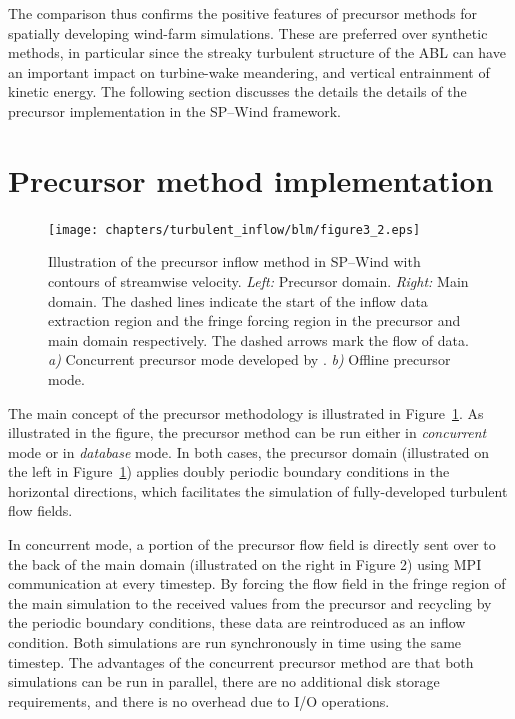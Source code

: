 	The comparison thus confirms the positive features of precursor methods for spatially developing wind-farm simulations. These are preferred over synthetic methods, in particular since the streaky turbulent structure of the ABL can have an important impact on turbine-wake meandering, and vertical entrainment of kinetic energy. The following section discusses the details 	the details of the precursor implementation in the SP--Wind framework.
	
\section{Precursor method implementation}\label{sec:inflow_CP}	
\begin{figure}
	\centering
	\texttt{[image: chapters/turbulent\_inflow/blm/figure3\_2.eps]}
	\caption{Illustration of the precursor inflow method in SP--Wind with contours of streamwise velocity. \textit{Left:} Precursor domain. \textit{Right: } Main domain. The dashed lines indicate the start of the inflow data extraction region and the fringe forcing region in the precursor and main domain respectively. The dashed arrows mark the flow of data. \emph{a)} Concurrent precursor mode developed by \cite{stevens2014concurrent}. \emph{b)} Offline precursor mode. \label{fig:CP0}}	
\end{figure}

The main concept of the precursor methodology is illustrated in Figure~\ref{fig:CP0}. As illustrated in the figure, the precursor method can be run either in \emph{concurrent} mode \citep{stevens2014concurrent} or in \emph{database} mode. In both cases, the precursor domain (illustrated on the left in Figure~\ref{fig:CP0}) applies doubly periodic boundary conditions in the horizontal directions, which facilitates the simulation of fully-developed turbulent flow fields. 

In concurrent mode, a portion of the precursor flow field is directly sent over to the back of the main domain (illustrated on the right in Figure 2) using MPI communication at every timestep. By forcing the flow field in the fringe region of the main simulation to the received values from the precursor and recycling by the periodic boundary conditions, these data are reintroduced as an inflow condition. Both simulations are run synchronously in time using the same timestep. The advantages of the concurrent precursor method are that both simulations can be run in parallel, there are no additional disk storage requirements, and there is no overhead due to I/O operations.

